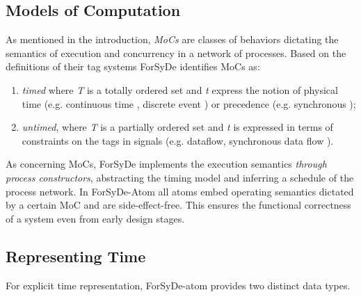 \subsection{Models of Computation}
As mentioned in the introduction, \emph{MoCs} are classes of behaviors
 dictating the semantics of execution and concurrency in a network
 of processes. Based on the definitions of their tag systems
 ForSyDe identifies MoCs as:\par
\begin{enumerate}
\item 
\emph{timed} where \emph{T} is a totally ordered set and \emph{t} express the
 notion of physical time (e.g. continuous time
 , discrete event
 ) or precedence (e.g. synchronous
 );\par

\item 
\emph{untimed}, where \emph{T} is a partially ordered set and \emph{t} is
 expressed in terms of constraints on the tags in signals
 (e.g. dataflow, synchronous data flow
 ).\par

\end{enumerate}
As concerning MoCs, ForSyDe implements the execution semantics
 \emph{through process constructors}, abstracting the timing model and
 inferring a schedule of the process network. In ForSyDe-Atom all
 atoms embed operating semantics dictated by a certain MoC and are
 side-effect-free. This ensures the functional correctness of a
 system even from early design stages.\par

\subsection{Representing Time}
For explicit time representation, ForSyDe-atom provides two
 distinct data types.\par

